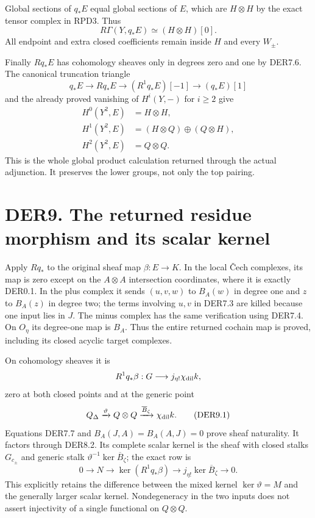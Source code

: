 Global sections of \(q_*E\) equal global sections of \(E\), which are
\(H\otimes H\) by the exact tensor complex in RPD3. Thus \[
R\Gamma(Y,q_*E)\simeq(H\otimes H)[0].
\tag{DER8.6}
\] All endpoint and extra closed coefficients remain inside \(H\) and
every \(W_\pm\).

Finally \(Rq_*E\) has cohomology sheaves only in degrees zero and one by
DER7.6. The canonical truncation triangle \[
q_*E\to Rq_*E\to(R^1q_*E)[-1]\to(q_*E)[1]
\] and the already proved vanishing of \(H^i(Y,-)\) for \(i\geq2\) give
\[
\begin{aligned}
H^0(Y^2,E)&=H\otimes H,\\
H^1(Y^2,E)&=(H\otimes Q)\oplus(Q\otimes H),\\
H^2(Y^2,E)&=Q\otimes Q.
\end{aligned}
\tag{DER8.7}
\] This is the whole global product calculation returned through the
actual adjunction. It preserves the lower groups, not only the top
pairing.

\section{DER9. The returned residue morphism and its scalar
kernel}\label{der9.-the-returned-residue-morphism-and-its-scalar-kernel}

Apply \(Rq_*\) to the original sheaf map \(\beta:E\to K\). In the local
Čech complexes, its map is zero except on the \(A\otimes A\)
intersection coordinates, where it is exactly DER0.1. In the plus
complex it sends \((u,v,w)\) to \(B_A(w)\) in degree one and \(z\) to
\(B_A(z)\) in degree two; the terms involving \(u,v\) in DER7.3 are
killed because one input lies in \(J\). The minus complex has the same
verification using DER7.4. On \(O_\eta\) its degree-one map is \(B_A\).
Thus the entire returned cochain map is proved, including its closed
acyclic target complexes.

On cohomology sheaves it is \[
R^1q_*\beta:G\longrightarrow j_{\eta!}\chi_{\rm dil}k,
\] zero at both closed points and at the generic point \[
Q_\Delta\xrightarrow{\vartheta}Q\otimes Q
 \xrightarrow{\overline B_\zeta}\chi_{\rm dil}k.
\tag{DER9.1}
\] Equations DER7.7 and \(B_A(J,A)=B_A(A,J)=0\) prove sheaf naturality.
It factors through DER8.2. Its complete scalar kernel is the sheaf with
closed stalks \(G_{c_\pm}\) and generic stalk
\(\vartheta^{-1}\ker\overline B_\zeta\); the exact row is \[
0\to N\longrightarrow\ker(R^1q_*\beta)
 \longrightarrow j_{\eta!}\ker\overline B_\zeta\to0.
\tag{DER9.2}
\] This explicitly retains the difference between the mixed kernel
\(\ker\vartheta=M\) and the generally larger scalar kernel.
Nondegeneracy in the two inputs does not assert injectivity of a single
functional on \(Q\otimes Q\).

